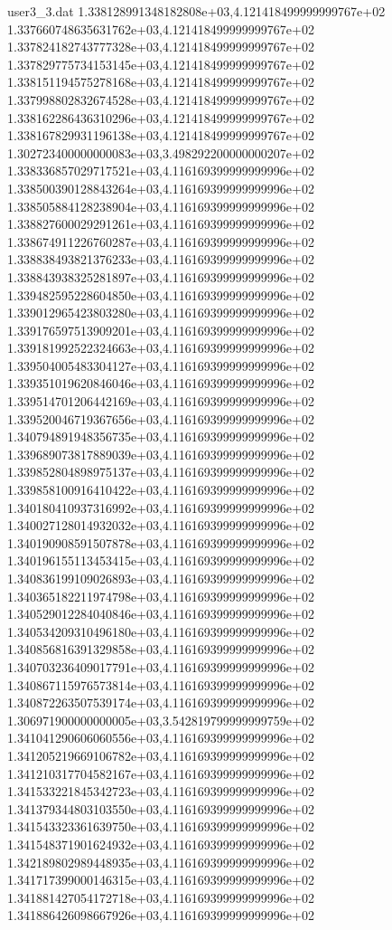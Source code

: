 \begin{filecontents}{user3_3.dat}
1.338128991348182808e+03,4.121418499999999767e+02
1.337660748635631762e+03,4.121418499999999767e+02
1.337824182743777328e+03,4.121418499999999767e+02
1.337829775734153145e+03,4.121418499999999767e+02
1.338151194575278168e+03,4.121418499999999767e+02
1.337998802832674528e+03,4.121418499999999767e+02
1.338162286436310296e+03,4.121418499999999767e+02
1.338167829931196138e+03,4.121418499999999767e+02
1.302723400000000083e+03,3.498292200000000207e+02
1.338336857029717521e+03,4.116169399999999996e+02
1.338500390128843264e+03,4.116169399999999996e+02
1.338505884128238904e+03,4.116169399999999996e+02
1.338827600029291261e+03,4.116169399999999996e+02
1.338674911226760287e+03,4.116169399999999996e+02
1.338838493821376233e+03,4.116169399999999996e+02
1.338843938325281897e+03,4.116169399999999996e+02
1.339482595228604850e+03,4.116169399999999996e+02
1.339012965423803280e+03,4.116169399999999996e+02
1.339176597513909201e+03,4.116169399999999996e+02
1.339181992522324663e+03,4.116169399999999996e+02
1.339504005483304127e+03,4.116169399999999996e+02
1.339351019620846046e+03,4.116169399999999996e+02
1.339514701206442169e+03,4.116169399999999996e+02
1.339520046719367656e+03,4.116169399999999996e+02
1.340794891948356735e+03,4.116169399999999996e+02
1.339689073817889039e+03,4.116169399999999996e+02
1.339852804898975137e+03,4.116169399999999996e+02
1.339858100916410422e+03,4.116169399999999996e+02
1.340180410937316992e+03,4.116169399999999996e+02
1.340027128014932032e+03,4.116169399999999996e+02
1.340190908591507878e+03,4.116169399999999996e+02
1.340196155113453415e+03,4.116169399999999996e+02
1.340836199109026893e+03,4.116169399999999996e+02
1.340365182211974798e+03,4.116169399999999996e+02
1.340529012284040846e+03,4.116169399999999996e+02
1.340534209310496180e+03,4.116169399999999996e+02
1.340856816391329858e+03,4.116169399999999996e+02
1.340703236409017791e+03,4.116169399999999996e+02
1.340867115976573814e+03,4.116169399999999996e+02
1.340872263507539174e+03,4.116169399999999996e+02
1.306971900000000005e+03,3.542819799999999759e+02
1.341041290606060556e+03,4.116169399999999996e+02
1.341205219669106782e+03,4.116169399999999996e+02
1.341210317704582167e+03,4.116169399999999996e+02
1.341533221845342723e+03,4.116169399999999996e+02
1.341379344803103550e+03,4.116169399999999996e+02
1.341543323361639750e+03,4.116169399999999996e+02
1.341548371901624932e+03,4.116169399999999996e+02
1.342189802989448935e+03,4.116169399999999996e+02
1.341717399000146315e+03,4.116169399999999996e+02
1.341881427054172718e+03,4.116169399999999996e+02
1.341886426098667926e+03,4.116169399999999996e+02

\end{filecontents}
